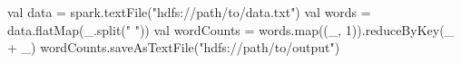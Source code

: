 val data = spark.textFile("hdfs://path/to/data.txt")
val words = data.flatMap(_.split(" "))
val wordCounts = words.map((_, 1)).reduceByKey(_ + _)
wordCounts.saveAsTextFile("hdfs://path/to/output")